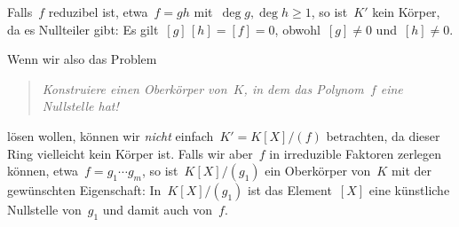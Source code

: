 \documentclass{../../alg2/algblatt}
\begin{document}
Falls~$f$ reduzibel ist, etwa~$f = gh$ mit~$\deg g, \deg h \geq 1$, so ist~$K'$
kein Körper, da es Nullteiler gibt: Es gilt~$[g]\,[h] = [f] = 0$, obwohl~$[g]
\neq 0$ und~$[h] \neq 0$.

Wenn wir also das Problem
\begin{quote}\emph{Konstruiere einen Oberkörper von~$K$, in dem das Polynom~$f$
eine Nullstelle hat!}\end{quote}
lösen wollen, können wir \emph{nicht} einfach~$K' = K[X]/(f)$ betrachten, da
dieser Ring vielleicht kein Körper ist. Falls wir aber~$f$ in irreduzible
Faktoren zerlegen können, etwa~$f = g_1 \cdots g_m$, so ist~$K[X]/(g_1)$ ein
Oberkörper von~$K$ mit der gewünschten Eigenschaft: In~$K[X]/(g_1)$ ist das
Element~$[X]$ eine künstliche Nullstelle von~$g_1$ und damit auch von~$f$.
\end{document}
